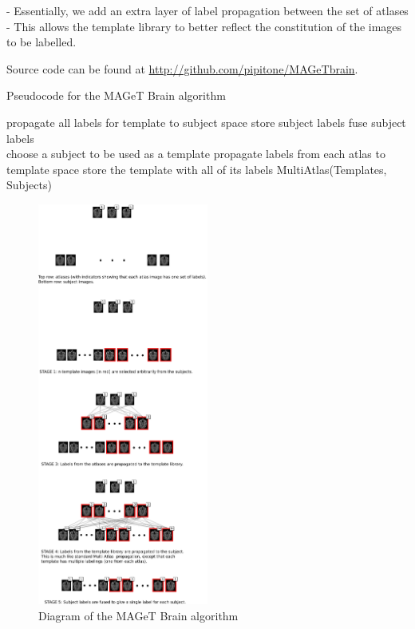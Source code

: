 \documentclass{article}\usepackage{graphicx, color}
\begin{document}
- Essentially, we add an extra layer of label propagation between the set of atlases 
- This allows the template library to better reflect the constitution of the images to be labelled.

Source code can be found at \url{http://github.com/pipitone/MAGeTbrain}.

\begin{algorithm}
\caption{Pseudocode for the MAGeT Brain algorithm}
\label{pseudocodesdf}
\begin{algorithmic}
      \State propagate all labels for template to subject space
      \State store subject labels
    \EndFor
    \State fuse subject labels
  \EndFor
\EndFunction
\\
    \State choose a subject to be used as a template
    \State propagate labels from each atlas to template space
    \State store the template with all of its labels
  \EndFor
  \State MultiAtlas(Templates, Subjects)
\EndFunction
\end{algorithmic}
\end{algorithm}

\begin{figure}[h]
  \centering
    \includegraphics[width=0.5\textwidth]{MAGeT-figure.png}
  \caption{Diagram of the MAGeT Brain algorithm}
\end{figure}
\end{document}
